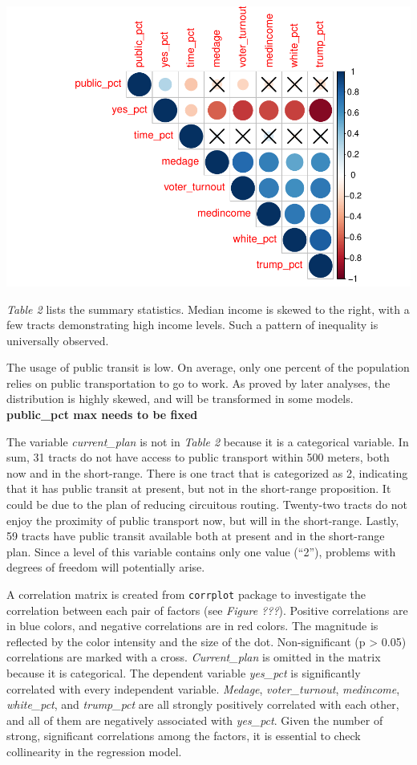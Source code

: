 \documentclass[
]{article}
\begin{document}
\includegraphics{Zhong_paper_files/figure-latex/create correlation matrix-1.pdf}

\emph{Table 2} lists the summary statistics. Median income is skewed to
the right, with a few tracts demonstrating high income levels. Such a
pattern of inequality is universally observed.

The usage of public transit is low. On average, only one percent of the
population relies on public transportation to go to work. As proved by
later analyses, the distribution is highly skewed, and will be
transformed in some models. \textbf{public\_pct max needs to be fixed}

The variable \emph{current\_plan} is not in \emph{Table 2} because it is
a categorical variable. In sum, 31 tracts do not have access to public
transport within 500 meters, both now and in the short-range. There is
one tract that is categorized as 2, indicating that it has public
transit at present, but not in the short-range proposition. It could be
due to the plan of reducing circuitous routing. Twenty-two tracts do not
enjoy the proximity of public transport now, but will in the
short-range. Lastly, 59 tracts have public transit available both at
present and in the short-range plan. Since a level of this variable
contains only one value (``2''), problems with degrees of freedom will
potentially arise.

A correlation matrix is created from \texttt{corrplot} package to
investigate the correlation between each pair of factors (see
\emph{Figure ???}). Positive correlations are in blue colors, and
negative correlations are in red colors. The magnitude is reflected by
the color intensity and the size of the dot. Non-significant (p
\textgreater{} 0.05) correlations are marked with a cross.
\emph{Current\_plan} is omitted in the matrix because it is categorical.
The dependent variable \emph{yes\_pct} is significantly correlated with
every independent variable. \emph{Medage}, \emph{voter\_turnout},
\emph{medincome}, \emph{white\_pct}, and \emph{trump\_pct} are all
strongly positively correlated with each other, and all of them are
negatively associated with \emph{yes\_pct}. Given the number of strong,
significant correlations among the factors, it is essential to check
collinearity in the regression model.
\end{document}
